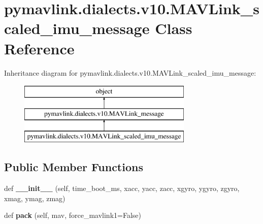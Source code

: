 \hypertarget{classpymavlink_1_1dialects_1_1v10_1_1MAVLink__scaled__imu__message}{}\section{pymavlink.\+dialects.\+v10.\+M\+A\+V\+Link\+\_\+scaled\+\_\+imu\+\_\+message Class Reference}
\label{classpymavlink_1_1dialects_1_1v10_1_1MAVLink__scaled__imu__message}
Inheritance diagram for pymavlink.\+dialects.\+v10.\+M\+A\+V\+Link\+\_\+scaled\+\_\+imu\+\_\+message\+:\begin{figure}[H]
\begin{center}
\leavevmode
\includegraphics[height=3.000000cm]{classpymavlink_1_1dialects_1_1v10_1_1MAVLink__scaled__imu__message}
\end{center}
\end{figure}
\subsection*{Public Member Functions}
\begin{DoxyCompactItemize}
\item 
\mbox{\label{classpymavlink_1_1dialects_1_1v10_1_1MAVLink__scaled__imu__message_ac2e557e78757e0cf004fe39e9176a789}} 
def {\bfseries \+\_\+\+\_\+init\+\_\+\+\_\+} (self, time\+\_\+boot\+\_\+ms, xacc, yacc, zacc, xgyro, ygyro, zgyro, xmag, ymag, zmag)
\item 
\mbox{\label{classpymavlink_1_1dialects_1_1v10_1_1MAVLink__scaled__imu__message_a8ce256914278af5ea2207a2bca3a14f2}} 
def {\bfseries pack} (self, mav, force\+\_\+mavlink1=False)
\end{DoxyCompactItemize}

